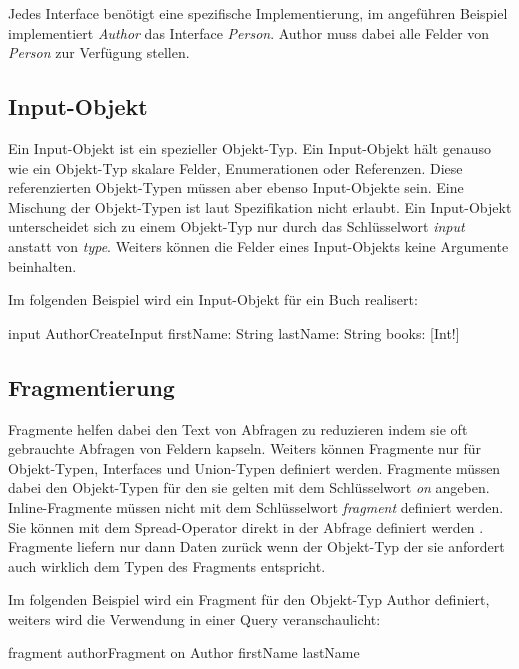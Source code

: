 Jedes Interface benötigt eine spezifische Implementierung, im angeführen Beispiel implementiert \textit{Author} das Interface \textit{Person}.
Author muss dabei alle Felder von \textit{Person} zur Verfügung stellen.

\subsection{Input-Objekt}
Ein Input-Objekt ist ein spezieller Objekt-Typ. Ein Input-Objekt hält genauso wie ein Objekt-Typ skalare Felder, Enumerationen oder Referenzen.
Diese referenzierten Objekt-Typen müssen aber ebenso Input-Objekte sein.
Eine Mischung der Objekt-Typen ist laut Spezifikation nicht erlaubt.
Ein Input-Objekt unterscheidet sich zu einem Objekt-Typ nur durch das Schlüsselwort \textit{input} anstatt von \textit{type}.
Weiters können die Felder eines Input-Objekts keine Argumente beinhalten.
\newline


Im folgenden Beispiel wird ein Input-Objekt für ein Buch realisert:
\begin{JsCode}
input AuthorCreateInput {
  firstName: String
  lastName: String
  books: [Int!]
}
\end{JsCode}

\subsection{Fragmentierung}\label{sec:Bezeichnung}
Fragmente helfen dabei den Text von Abfragen zu reduzieren indem sie oft gebrauchte Abfragen von Feldern kapseln.
Weiters können Fragmente nur für Objekt-Typen, Interfaces und Union-Typen definiert werden.
Fragmente müssen dabei den Objekt-Typen für den sie gelten mit dem Schlüsselwort  \textit{on} angeben.
Inline-Fragmente müssen nicht mit dem Schlüsselwort \textit{fragment} definiert werden.
Sie können mit dem Spread-Operator direkt in der Abfrage definiert werden \cite[Abs. 2.8 -  2.8.1]{graphqlOnline}.
Fragmente liefern nur dann Daten zurück wenn der Objekt-Typ der sie anfordert auch wirklich dem Typen des Fragments entspricht.

Im folgenden Beispiel wird ein Fragment für den Objekt-Typ Author definiert, weiters wird die Verwendung in einer Query veranschaulicht:
\begin{JsCode}
fragment authorFragment on Author {
    firstName
    lastName
}

\end{JsCode}


